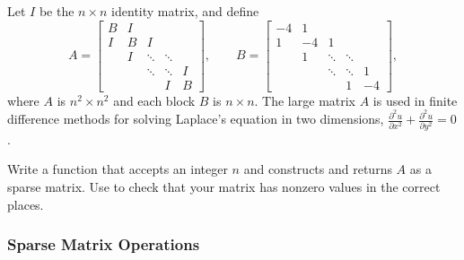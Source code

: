 \begin{problem} %
Let $I$ be the $n\times n$ identity matrix, and define
\[
A =\left[\begin{array}{ccccc}
B & I &      &        & \\
I & B &  I   &        & \\
  & I & \ddots & \ddots & \\
  &   & \ddots & \ddots & I \\
  &   &        &    I   & B
\end{array}\right],
\qquad
B = \left[\begin{array}{rrrrr}
-4 &  1 &      &        & \\
 1 & -4 &  1   &        & \\
   &  1 & \ddots & \ddots & \\
   &    & \ddots & \ddots & 1 \\
   &    &        &    1   & -4
\end{array}\right],
\]
where $A$ is $n^2\times n^2$ and each block $B$ is $n\times n$.
The large matrix $A$ is used in finite difference methods for solving Laplace's equation in two dimensions, $\frac{\partial^2u}{\partial x^2} + \frac{\partial^2u}{\partial y^2} = 0$.

Write a function that accepts an integer $n$ and constructs and returns $A$ as a sparse matrix.
Use  to check that your matrix has nonzero values in the correct places.
\label{prob:sparse-construction}
\end{problem}

\begin{comment}
\begin{info} %
A \emph{banded} matrix is a square matrix whose only non-zero entries are on the main diagonal and on some diagonals on either side.
If the nonzero entries are confined to the three central diagonals, the matrix is also called \emph{tri-diagonal}.
Banded matrices arise naturally in many applications, including numerical methods for solving certain kinds of differential equations.
\end{info}
\end{comment}

\subsubsection*{Sparse Matrix Operations} %

